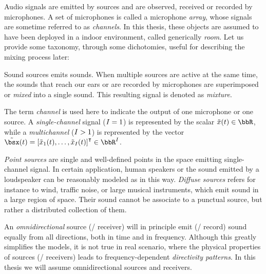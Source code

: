\mynewline
Audio signals are emitted by sources and are observed, received or recorded by microphones.
A set of microphones is called a microphone \textit{array}, whose signals are sometime referred to as \textit{channels}.
In this thesis, these objects are assumed to have been deployed in a indoor environment, called generically \textit{room}.
Let us provide some taxonomy, through some dichotomies, useful for describing the mixing process later:

 Sound sources emits sounds.
When multiple sources are active at the same time, the sounds that reach our ears or are recorded by microphones are superimposed or \textit{mixed} into a single sound.
This resulting signal is denoted as \textit{mixture}.

 The term \textit{channel}
is used here to indicate the output of one microphone or one source.
A \textit{single-channel} signal ($I = 1$) is represented by the scalar $\tilde{\mic}(t) \in \R$,
while a \textit{multichannel} ($I >   1$) is represented by the vector $\tilde{\mics}(t) = \ktranspose{\klist{\tilde{\mic}_1(t), \dots, \tilde{\mic}_{\numMics}(t)}} \in \R^{\numMics}$.

 \textit{Point sources} are single and well-defined points in the space emitting single-channel signal.
In certain application, human speakers or the sound emitted by a loudspeaker can be reasonably modeled as in this way.
\textit{Diffuse sources} refers for instance to wind, traffic noise, or large musical instruments, which emit sound in a large region of space.
Their sound cannot be associate to a punctual source, but rather a distributed collection of them.

 An \textit{omnidirectional} source (\resp/ receiver) will in principle emit (\resp/ record) sound equally from all directions,
both in time and in frequency.
Although this greatly simplifies the models, it is not true in real scenario, where the physical properties of sources (\resp/ receivers) leads to frequency-dependent \textit{directivity patterns}.
In this thesis we will assume omnidirectional sources and receivers.

